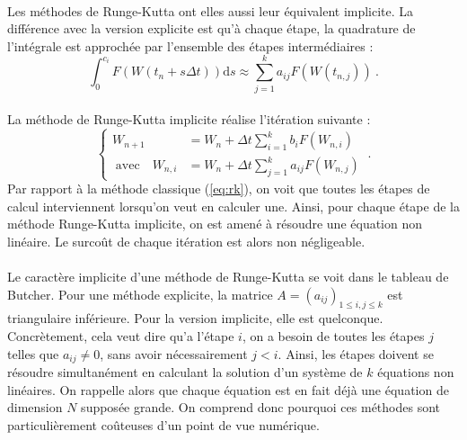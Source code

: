     \paragraph{}
    Les méthodes de Runge-Kutta ont elles aussi leur équivalent implicite.
    La différence avec la version explicite est qu'à chaque étape, la quadrature de l'intégrale est approchée par l'ensemble des étapes intermédiaires :
    \[\int_0^{c_i}F\left(W\left(t_n + s\Delta t\right)\right)\mathrm{d}s \approx \sum_{j = 1}^ka_{ij}F\left(W\left(t_{n,j}\right)\right)\ .\]

    \paragraph{}
    La méthode de Runge-Kutta implicite réalise l'itération suivante :
    \begin{equation}\label{eq:rk_impl}
      \left\{\begin{aligned}
        W_{n+1} &= W_n + \Delta t\sum_{i = 1}^kb_iF\left(W_{n,i}\right) \\
        \;\textrm{avec}\quad W_{n,i} &= W_n + \Delta t \sum_{j = 1}^ka_{ij}F\left(W_{n,j}\right)
      \end{aligned}\right.\ .
    \end{equation}
    Par rapport à la méthode classique (\ref{eq:rk}), on voit que toutes les étapes de calcul interviennent lorsqu'on veut en calculer une.
    Ainsi, pour chaque étape de la méthode Runge-Kutta implicite, on est amené à résoudre une équation non linéaire.
    Le surcoût de chaque itération est alors non négligeable.

    \paragraph{}
    Le caractère implicite d'une méthode de Runge-Kutta se voit dans le tableau de Butcher.
    Pour une méthode explicite, la matrice $A = \left(a_{ij}\right)_{1\leq i, j\leq k}$ est triangulaire inférieure.
    Pour la version implicite, elle est quelconque.
    Concrètement, cela veut dire qu'a l'étape $i$, on a besoin de toutes les étapes $j$ telles que $a_{ij}\neq 0$, sans avoir nécessairement $j < i$.
    Ainsi, les étapes doivent se résoudre simultanément en calculant la solution d'un système de $k$ équations non linéaires.
    On rappelle alors que chaque équation est en fait déjà une équation de dimension $N$ supposée grande.
    On comprend donc pourquoi ces méthodes sont particulièrement coûteuses d'un point de vue numérique.

